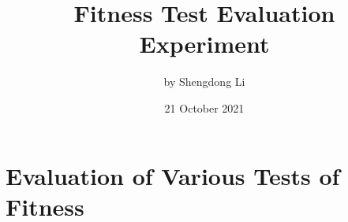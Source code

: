 \documentclass[12pt]{article}
\begin{document}
\title{Fitness Test Evaluation Experiment}
\author{by Shengdong Li}
\date{21 October 2021}
\maketitle

\section*{Evaluation of Various Tests of Fitness}


\end{document}
